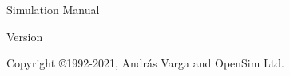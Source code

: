\begin{center}\end{center}
\vspace{4cm}
\textbf{\fontsize{60}{80}\selectfont {\opp}}\par
\vspace{0.25cm}
{\fontsize{36}{50}\selectfont Simulation Manual}\par
{\LARGE Version {\oppversion}\par}
\vfill
\newpage
Copyright \copyright 1992-2021, Andr\'{a}s Varga and OpenSim Ltd.\par
\newpage